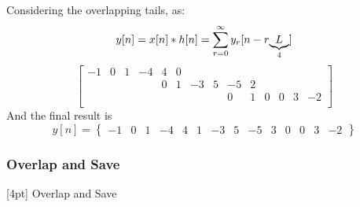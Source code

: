 {        \vspace{1em}
        Considering the overlapping tails, as:
        $$
        y[n]=x[n]*h[n]=\sum_{r=0}^\infty y_r[n-r\underlabel{L}{4}]
        $$
        $$
        \begin{bmatrix}
            -1 & 0 & 1 &-4 & 4 & 0\\
            &   &   &   & 0 & 1 &-3 & 5 &-5 & 2\\    
            &   &   &   &   &   &   &   & 0 & 1 & 0 & 0 & 3 & -2\\    
        \end{bmatrix}
        $$
        And the final result is
        $$
        y[n]=\begin{Bmatrix}
            -1 & 0 & 1 & -4 & 4 & 1 & -3 & 5 & -5 & 3 & 0 & 0 & 3 & -2
        \end{Bmatrix}
        $$
    }
    \subsubsection{Overlap and Save}
    [4pt] Overlap and Save

